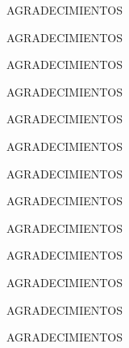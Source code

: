 %
\thispagestyle{empty} 
      


AGRADECIMIENTOS

AGRADECIMIENTOS

AGRADECIMIENTOS

AGRADECIMIENTOS

AGRADECIMIENTOS

AGRADECIMIENTOS

AGRADECIMIENTOS

AGRADECIMIENTOS

AGRADECIMIENTOS

AGRADECIMIENTOS

AGRADECIMIENTOS

AGRADECIMIENTOS

AGRADECIMIENTOS


